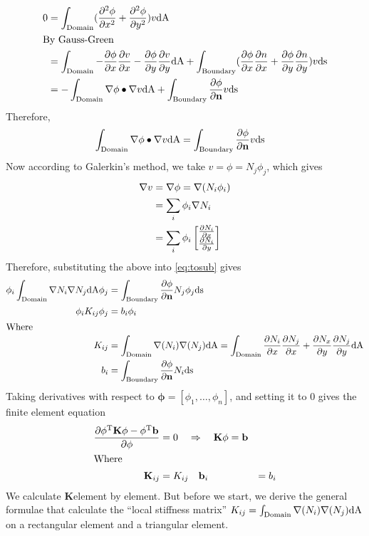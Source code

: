 \def\x{
  \ensuremath{\inta{\nabla \phi \bullet \nabla v}}
}
\def\y{
  \ensuremath{\intb{\phin v}}
}


\begin{align}
  0 &= \inta{(\dxx{\phi} + \dyy{\phi}) v} \notag\\
  \intertext{By Gauss-Green}
    &= \inta{-\dx{\phi}\dx{v} - \dy{\phi}\dy{v}} +
      \intb{
      (\dx{\phi}\dx{n} + \dy{\phi}\dy{n})v
      } \notag\\
    &= -\x + \y \notag
\end{align}
Therefore,
\begin{align}
  \x &= \y \label{eq:tosub}
\end{align}
Now according to Galerkin's method, we take $v = \phi = N_j\phi_j$, which gives
\begin{align}
  \nabla v &= \nabla \phi = \nabla (N_i \phi_i) \notag\\
           &= \sum_i \phi_i \nabla N_i \notag\\
  &= \sum_i \phi_i
    \begin{bmatrix}
      \frac{\partial N_i}{\partial x} \\ \frac{\partial N_i}{\partial y}
    \end{bmatrix} \notag
\end{align}
Therefore, substituting the above into \cref{eq:tosub} gives
\def\x{\ensuremath{\inta{\nabla (N_i)\nabla (N_j)}}}
\def\y{\ensuremath{\intb{\phin N_i}}}
\begin{align}
  \phi_i \inta{\nabla N_i \nabla N_j} \phi_j &= \intb{\phin N_j \phi_j} \notag\\
  \phi_i K_{ij} \phi_j &= b_i \phi_i \notag\\
  \intertext{Where}
  K_{ij} &= \x = \inta{\dx{N_i}\dx{N_j} + \dy{N_x}\dy{N_j}} \notag\\
  b_i &= \y \notag
\end{align}
Taking derivatives with respect to $\mathbf{\phi} = [\phi_1, \dotsc, \phi_n]$,
and setting it to 0 gives the finite element equation
\def\tr#1{\ensuremath{{#1}^{\text{T}}}}
\def\p{\mathbf{\phi}}
\begin{align}
  \dX[\p]{\tr{\p} \mathbf{K} \p - \tr{\p}\mathbf{b}} &= 0 \quad \Rightarrow \quad
                                                       \mathbf{K}\p = \mathbf{b}
                                                       \label{eq:fe} \\
  \intertext{Where}
  \mathbf{K}_{ij} &= K_{ij} \quad \mathbf{b}_{i} &= b_i \notag
\end{align}
\def\K{\ensuremath{\mathbf{K}}}
We calculate \K element by element. But before we start, we derive the general
formulae that calculate the ``local stiffness matrix'' $K_{ij} = \x $ on a
rectangular element and a triangular element.

